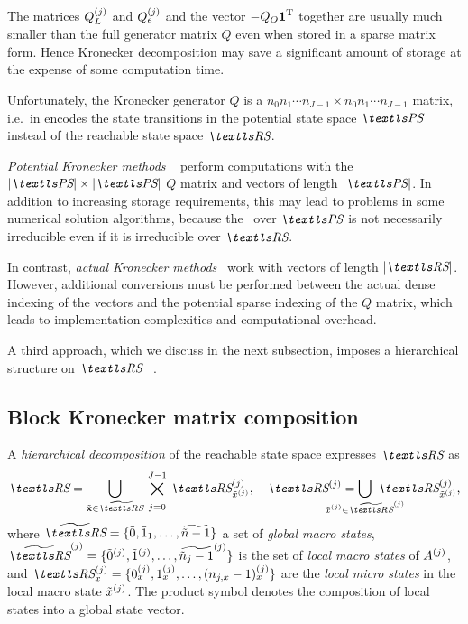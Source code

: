 The matrices $Q_L^{(j)}$ and $Q_e^{(j)}$ and the vector
$-Q_O \bm{\mathrm{1}}^{\mathrm{T}}$ together are usually much smaller than the full
generator matrix $Q$ even when stored in a sparse matrix form. Hence
Kronecker decomposition may save a significant amount of storage at
the expense of some computation time.

Unfortunately, the Kronecker generator $Q$ is a
$n_0 n_1 \cdots n_{J - 1} \times n_0 n_1 \cdots n_{J - 1}$ matrix,
i.e.~in encodes the state transitions in the potential state space
$\PS$ instead of the reachable state space $\RS$.

\emph{Potential Kronecker methods}%
~\citep{DBLP:journals/informs/BuchholzCDK00} perform computations with
the $\lvert \PS \rvert \times \lvert \PS \rvert$ $Q$ matrix and
vectors of length $\lvert \PS \rvert$. In addition to increasing
storage requirements, this may lead to problems in some numerical
solution algorithms, because the \CTMC\ over $\PS$ is not necessarily
irreducible even if it is irreducible over $\RS$.

In contrast, \emph{actual Kronecker methods}~%
\citep{DBLP:journals/tse/Kemper96,%
  DBLP:journals/informs/BuchholzCDK00,%
  DBLP:journals/fgcs/BenoitPS06} work with vectors of length
$\lvert \RS \rvert$. However, additional conversions must be performed
between the actual dense indexing of the vectors and the potential
sparse indexing of the $Q$ matrix, which leads to implementation
complexities and computational overhead.

A third approach, which we discuss in the next subsection, imposes a
hierarchical structure on $\RS$~%
\citep{DBLP:conf/cpe/BauseBK98,%
  DBLP:journals/sigmetrics/BuchholzK98,%
  DBLP:journals/tse/Buchholz99}.

\subsection{Block Kronecker matrix composition}

A \emph{hierarchical decomposition} of the reachable state space expresses
$\RS$ as
\begin{equation}
  \RS = \bigcup_{\macro{\vec{x}} \in \Macro{\RS}} \,
  \bigtimes_{\vphantom{\Macro{\RS}}j = 0}^{J - 1}
  \, \loc{\RS}{j}_{\loc{\macro{x}}{j}}, \quad
  \loc{\RS}{j} = \bigcup_{\mathclap{\loc{\macro{x}}{j} \in \loc{\Macro{\RS}}{j}}}
  \,\, \loc{\RS}{j}_{\loc{\macro{x}}{j}} \text,
\end{equation}
where
$\Macro{\RS} = \{\macro{0}, \macro{1}_1, \ldots, \Macro{\macro{n} - 1}
\}$
a set of \emph{global macro states},
$\loc{\Macro{\RS}}{j} = \{\loc{\macro{0}}{j}, \loc{\macro{1}}{j},
\ldots, \loc{\Macro{\macro{n}_j - 1}}{j} \}$ is the set of \emph{local
macro states} of $A^{(j)}$, and $\loc{\RS}{j}_{x} = \{\loc{0}{j}_x,
\loc{1}{j}_x, \ldots, \loc{(n_{j, x} - 1)}{j}_x \}$ are the
\emph{local micro states} in the local macro state
$\tilde{x}^{(j)}$. The product symbol denotes the composition of
local states into a global state vector.

